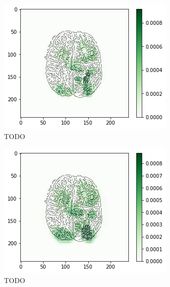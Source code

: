 \begin{figure}[H]
    \centering
    \begin{subfigure}{.33\textwidth}
        \centering
        \includegraphics[width=\linewidth]{chapters/06_hdm/b_Brats18_TCIA08_242_1_L2/24.png}
        \caption{TODO}
    \end{subfigure}%
    \begin{subfigure}{.33\textwidth}
        \centering
        \includegraphics[width=\linewidth]{chapters/06_hdm/circle15/4.png}
        \caption{TODO}
    \end{subfigure}
        \begin{subfigure}{.33\textwidth}
        \centering

\end{subfigure}
\end{figure}

